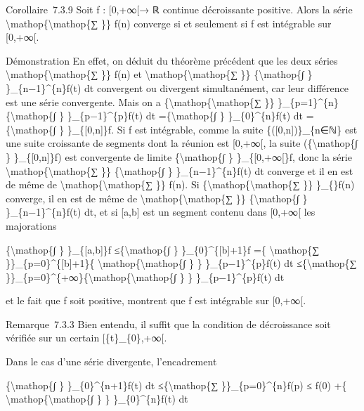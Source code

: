 \documentclass[]{article}
\begin{document}
Corollaire~7.3.9 Soit f : {[}0,+∞{[}→ ℝ continue décroissante positive.
Alors la série \textbackslash{}mathop\{\textbackslash{}mathop\{∑ \}\}
f(n) converge si et seulement si f est intégrable sur {[}0,+∞{[}.

Démonstration En effet, on déduit du théorème précédent que les deux
séries \textbackslash{}mathop\{\textbackslash{}mathop\{∑ \}\} f(n) et
\textbackslash{}mathop\{\textbackslash{}mathop\{∑ \}\}
\{\textbackslash{}mathop\{∫ \} \}\_\{n−1\}\^{}\{n\}f(t) dt convergent ou
divergent simultanément, car leur différence est une série convergente.
Mais on a \{\textbackslash{}mathop\{\textbackslash{}mathop\{∑ \}\}
\}\_\{p=1\}\^{}\{n\}\{\textbackslash{}mathop\{∫ \}
\}\_\{p−1\}\^{}\{p\}f(t) dt =\{\textbackslash{}mathop\{∫ \}
\}\_\{0\}\^{}\{n\}f(t) dt =\{\textbackslash{}mathop\{∫ \}
\}\_\{{[}0,n{]}\}f. Si f est intégrable, comme la suite
\{({[}0,n{]})\}\_\{n∈ℕ\} est une suite croissante de segments dont la
réunion est {[}0,+∞{[}, la suite (\{\textbackslash{}mathop\{∫ \}
\}\_\{{[}0,n{]}\}f) est convergente de limite
\{\textbackslash{}mathop\{∫ \} \}\_\{{[}0,+∞{[}\}f, donc la série
\textbackslash{}mathop\{\textbackslash{}mathop\{∑ \}\}
\{\textbackslash{}mathop\{∫ \} \}\_\{n−1\}\^{}\{n\}f(t) dt converge et
il en est de même de \textbackslash{}mathop\{\textbackslash{}mathop\{∑
\}\} f(n). Si \{\textbackslash{}mathop\{\textbackslash{}mathop\{∑ \}\}
\}\_\{\}f(n) converge, il en est de même de
\textbackslash{}mathop\{\textbackslash{}mathop\{∑ \}\}
\{\textbackslash{}mathop\{∫ \} \}\_\{n−1\}\^{}\{n\}f(t) dt, et si
{[}a,b{]} est un segment contenu dans {[}0,+∞{[} les majorations

\{\textbackslash{}mathop\{∫ \} \}\_\{{[}a,b{]}\}f
≤\{\textbackslash{}mathop\{∫ \} \}\_\{0\}\^{}\{{[}b{]}+1\}f =\{
\textbackslash{}mathop\{∑ \}\}\_\{p=0\}\^{}\{{[}b{]}+1\}\{
\textbackslash{}mathop\{\textbackslash{}mathop\{∫ \} \}
\}\_\{p−1\}\^{}\{p\}f(t) dt ≤\{\textbackslash{}mathop\{∑
\}\}\_\{p=0\}\^{}\{+∞\}\{\textbackslash{}mathop\{\textbackslash{}mathop\{∫
\} \} \}\_\{p−1\}\^{}\{p\}f(t) dt

et le fait que f soit positive, montrent que f est intégrable sur
{[}0,+∞{[}.

Remarque~7.3.3 Bien entendu, il suffit que la condition de décroissance
soit vérifiée sur un certain {[}\{t\}\_\{0\},+∞{[}.

Dans le cas d'une série divergente, l'encadrement

\{\textbackslash{}mathop\{∫ \} \}\_\{0\}\^{}\{n+1\}f(t) dt
≤\{\textbackslash{}mathop\{∑ \}\}\_\{p=0\}\^{}\{n\}f(p) ≤ f(0) +\{
\textbackslash{}mathop\{\textbackslash{}mathop\{∫ \} \}
\}\_\{0\}\^{}\{n\}f(t) dt
\end{document}
